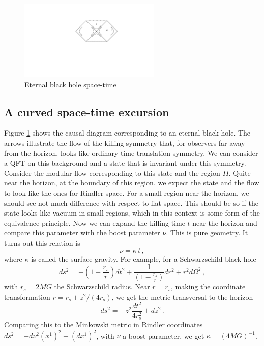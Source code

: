 \documentclass[11pt]{article}
\numberwithin{equation}{section}
\newcommand{\be}{\begin{equation}}
\newcommand{\ee}{\end{equation}}
\begin{document}
\begin{figure}[t]
\begin{center}  
\includegraphics[width=0.6\textwidth]{bh.pdf}
\captionsetup{width=0.9\textwidth}
\caption{Eternal black hole space-time}
\label{bhh}
\end{center}  
\end{figure}
\subsection{A curved space-time excursion} 
\label{curved}


Figure \ref{bhh} shows the causal diagram corresponding to an eternal black hole. The arrows illustrate the flow of the killing symmetry that, for observers far away from the horizon,  looks like ordinary time translation symmetry. We can consider a QFT on this background and a state that is invariant under this symmetry. Consider the modular flow corresponding to this state and the region $II$. Quite near the horizon, at the boundary of this region, we expect the state and the flow to look like the ones for Rindler space. For a small region near the horizon, we should see not much difference with respect to flat space.  This should be so if the state looks like vacuum in small regions, which in this context is some form of the equivalence principle. Now we can expand the killing time $t$ near the horizon and compare this parameter with the boost parameter $\nu$. This is pure geometry. It turns out this relation is
\be
\nu= \kappa\, t\,,   \label{pop}
\ee       
where $\kappa$ is called the surface gravity.  
For example, for a Schwarzschild black hole
\be
ds^2=-\left(1-\frac{r_s}{r}\right) dt^2 + \frac{1}{\left(1-\frac{r_s}{r}\right)} dr^2 +r^2 d\Omega^2\,,
\ee
with $r_s=2 M G$ the Schwarzschild radius. Near $r=r_s$, making the coordinate  transformation $r=r_s+ z^2/(4 r_s)$, we get the metric transversal to the horizon
\be
ds^2= -z^2 \frac{dt^2}{4 r_s^2}+dz^2\,. 
\ee
Comparing this to the Minkowski metric in Rindler coordinates $ds^2= - d\nu^2 (x^1)^2 + (dx^1)^2$, with $\nu$ a boost parameter, we get $\kappa=(4 M G)^{-1}$. 
\end{document}
